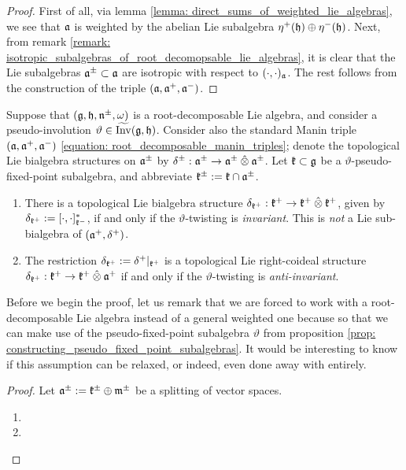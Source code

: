             \begin{proof}
                First of all, via lemma \ref{lemma: direct_sums_of_weighted_lie_algebras}, we see that $\mathfrak{a}$ is weighted by the abelian Lie subalgebra $\eta^+(\mathfrak{h}) \oplus \eta^-(\mathfrak{h})$. Next, from remark \ref{remark: isotropic_subalgebras_of_root_decomopsable_lie_algebras}, it is clear that the Lie subalgebras $\mathfrak{a}^{\pm} \subset \mathfrak{a}$ are isotropic with respect to $(\cdot, \cdot)_{\mathfrak{a}}$. The rest follows from the construction of the triple $(\mathfrak{a}, \mathfrak{a}^+, \mathfrak{a}^-)$.
            \end{proof}
        \begin{theorem} \label{theorem: lie_bialgebras_from_invariantly_twisted_manin_triples}
            Suppose that $(\mathfrak{g}, \mathfrak{h}, \mathfrak{n}^{\pm}, \omega)$ is a root-decomposable Lie algebra, and consider a pseudo-involution $\vartheta \in \widetilde{\operatorname{Inv}}(\mathfrak{g}, \mathfrak{h})$. Consider also the standard Manin triple $(\mathfrak{a}, \mathfrak{a}^+, \mathfrak{a}^-)$ \eqref{equation: root_decomposable_manin_triples}; denote the topological Lie bialgebra structures on $\mathfrak{a}^{\pm}$ by $\delta^{\pm}: \a^{\pm} \to \a^{\pm} \hattensor \a^{\pm}$. Let $\mathfrak{k} \subset \mathfrak{g}$ be a $\vartheta$-pseudo-fixed-point subalgebra, and abbreviate $\mathfrak{k}^{\pm} := \mathfrak{k} \cap \mathfrak{a}^{\pm}$.
            \begin{enumerate}
                \item There is a topological Lie bialgebra structure $\delta_{\k^+}: \k^+ \to \k^+ \hattensor \k^+$, given by $\delta_{\mathfrak{k}^+} := [\cdot, \cdot]_{\mathfrak{k}^-}^*$, if and only if the $\vartheta$-twisting is \textit{invariant}. This is \textit{not} a Lie sub-bialgebra of $(\mathfrak{a}^+, \delta^+)$.
                \item The restriction $\delta_{\mathfrak{k}^+} := \delta^+|_{\mathfrak{k}^+}$ is a topological Lie right-coideal structure $\delta_{\k^+}: \k^+ \to \k^+ \hattensor \a^+$ if and only if the $\vartheta$-twisting is \textit{anti-invariant}.
            \end{enumerate}
        \end{theorem}
        \begin{remark}
            Before we begin the proof, let us remark that we are forced to work with a root-decomposable Lie algebra instead of a general weighted one because so that we can make use of the pseudo-fixed-point subalgebra $\vartheta$ from proposition \ref{prop: constructing_pseudo_fixed_point_subalgebras}. It would be interesting to know if this assumption can be relaxed, or indeed, even done away with entirely.
        \end{remark}
            \begin{proof}
                Let $\mathfrak{a}^{\pm} := \mathfrak{k}^{\pm} \oplus \mathfrak{m}^{\pm}$ be a splitting of vector spaces. 
                \begin{enumerate}
                    \item 
                    \item 
                \end{enumerate}
            \end{proof}

